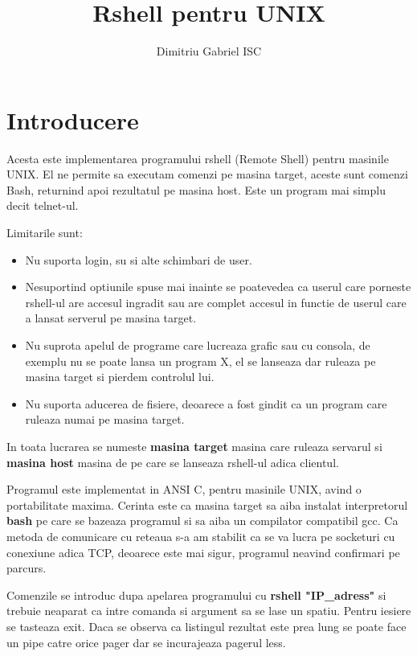 \documentclass{report}
\begin{document}
\title{Rshell pentru UNIX}
\author{Dimitriu Gabriel ISC}
\date{}
\maketitle
\tableofcontents

\chapter{Introducere}

\hspace{5mm}Acesta este implementarea programului rshell (Remote Shell)
pentru masinile UNIX. El ne permite sa executam comenzi pe masina target,
aceste sunt comenzi Bash, returnind apoi rezultatul pe masina host. Este un
program mai simplu decit telnet-ul.

Limitarile sunt:

\begin{itemize}
\item  Nu suporta login, su si alte schimbari de user.

\item  Nesuportind optiunile spuse mai inainte se poatevedea ca userul care
porneste rshell-ul are accesul ingradit sau are complet accesul in functie
de userul care a lansat serverul pe masina target.

\item  Nu suprota apelul de programe care lucreaza grafic sau cu consola, de
exemplu nu se poate lansa un program X, el se lanseaza dar ruleaza pe masina
target si pierdem controlul lui.

\item  Nu suporta aducerea de fisiere, deoarece a fost gindit ca un program
care ruleaza numai pe masina target.
\end{itemize}

In toata lucrarea se numeste \textbf{masina target} masina care ruleaza
servarul si \textbf{masina host} masina de pe care se lanseaza rshell-ul
adica clientul.

Programul este implementat in ANSI C, pentru masinile UNIX, avind o
portabilitate maxima. Cerinta este ca masina target sa aiba instalat
interpretorul \textbf{bash} pe care se bazeaza programul si sa aiba un
compilator compatibil gcc. Ca metoda de comunicare cu reteaua s-a am
stabilit ca se va lucra pe socketuri cu conexiune adica TCP, deoarece este
mai sigur, programul neavind confirmari pe parcurs.

Comenzile se introduc dupa apelarea programului cu \textbf{rshell
"IP\_adress"} si trebuie neaparat ca intre comanda si argument sa se lase un
spatiu. Pentru iesiere se tasteaza exit. Daca se observa ca listingul
rezultat este prea lung se poate face un pipe catre orice pager dar se
incurajeaza pagerul less.
\end{document}
